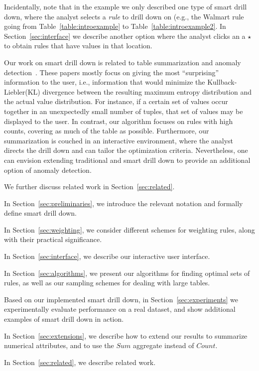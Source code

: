 Incidentally, note that in the example we only described one type of smart drill down,
where the analyst selects a {\em rule} to drill down on
(e.g., the Walmart rule going from Table~\ref{table:introexample} to
Table~\ref{table:introexample2}.
In Section~\ref{sec:interface} we describe another option
where the analyst clicks an a $\star$ to obtain
rules that have values in that location.

Our work on smart drill down is related
to table summarization and anomaly
detection~\cite{Sarawagi:2001:UMA:767141.767148,
Sarawagi00user-adaptiveexploration,
Sarawagi98discovery-drivenexploration,
DBLP:journals/pvldb/GebalyAGKS14}.
These papers mostly focus on
giving the most ``surprising'' information to the user, i.e., information
that would minimize the Kullback-Liebler(KL) divergence between the
resulting maximum entropy distribution and the actual value distribution. For instance, if a certain set of
values occur together in an unexpectedly small number of tuples, that
set of values may be displayed to the user. In contrast, our algorithm
focuses on rules with high counts, covering as
much of the table as possible.
Furthermore, our summarization is couched in
an interactive environment, where the analyst
directs the drill down and can tailor the optimization criteria.
Nevertheless, one can envision extending traditional
and smart drill down to provide an additional option of anomaly detection.

We further discuss related work in Section~\ref{sec:related}.

\squishlist 

\item In Section~\ref{sec:preliminaries}, we introduce the relevant
notation and formally define smart drill down.

\item In Section~\ref{sec:weighting}, we consider different schemes
for weighting rules, along with their practical significance.

\item In Section~\ref{sec:interface}, we describe our
interactive user interface. 
  
\item In Section~\ref{sec:algorithms}, we present our algorithms for
finding optimal sets of rules, as well as our sampling schemes
for dealing with large tables.

\item Based on our implemented smart drill down,
in Section~\ref{sec:experiments} we experimentally evaluate
performance on a real dataset,
and show additional examples of smart drill down in action.

\item In Section~\ref{sec:extensions}, we describe how to extend our results to summarize numerical attributes, and to use the $Sum$ aggregate instead of $Count$.

\item In Section~\ref{sec:related}, we describe related work.
\squishend 
